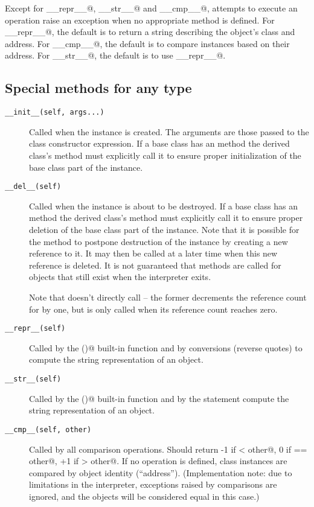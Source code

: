 Except for \verb@__repr__@, \verb@__str__@ and \verb@__cmp__@,
attempts to execute an
operation raise an exception when no appropriate method is defined.
For \verb@__repr__@, the default is to return a string describing the
object's class and address.
For \verb@__cmp__@, the default is to compare instances based on their
address.
For \verb@__str__@, the default is to use \verb@__repr__@.


\subsection{Special methods for any type}

\begin{description}

\item[\tt __init__(self, args...)]
Called when the instance is created.  The arguments are those passed
to the class constructor expression.  If a base class has an
 method the derived class's  method must
explicitly call it to ensure proper initialization of the base class
part of the instance.

\item[\tt __del__(self)]
Called when the instance is about to be destroyed.  If a base class
has an  method the derived class's  method
must explicitly call it to ensure proper deletion of the base class
part of the instance.  Note that it is possible for the 
method to postpone destruction of the instance by creating a new
reference to it.  It may then be called at a later time when this new
reference is deleted.  It is not guaranteed that
 methods are called for objects that still exist when
the interpreter exits.

Note that  doesn't directly call  -- the
former decrements the reference count for  by one, but
 is only called when its reference count reaches zero.

\item[\tt __repr__(self)]
Called by the \verb@repr()@ built-in function and by conversions
(reverse quotes) to compute the string representation of an object.

\item[\tt __str__(self)]
Called by the \verb@str()@ built-in function and by the \verb@print@
statement compute the string representation of an object.

\item[\tt __cmp__(self, other)]
Called by all comparison operations.  Should return -1 if
\verb@self < other@,  0 if \verb@self == other@, +1 if
\verb@self > other@.  If no  operation is defined, class
instances are compared by object identity (``address'').
(Implementation note: due to limitations in the interpreter,
exceptions raised by comparisons are ignored, and the objects will be
considered equal in this case.)


\end{description}
